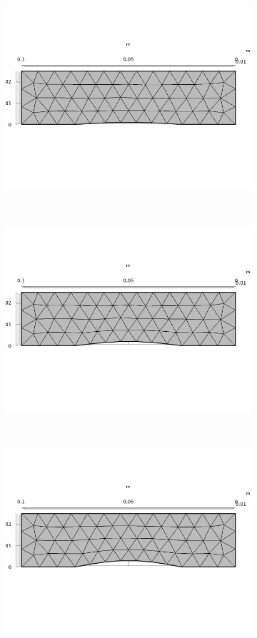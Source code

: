 \documentclass[a4paper]{article}
\begin{document}
\begin{figure}[h]
	\centering
	\begin{subfigure}{0.22\linewidth}
		\centering
		\includegraphics[width=0.95\linewidth]{01.jpg}
	\end{subfigure}
	~
	\begin{subfigure}{0.22\linewidth}
		\centering
		\includegraphics[width=0.95\linewidth]{02.jpg}
	\end{subfigure}
	~
	\begin{subfigure}{0.22\linewidth}
		\centering
		\includegraphics[width=0.95\linewidth]{03.jpg}
	\end{subfigure}


\end{figure}
\end{document}
